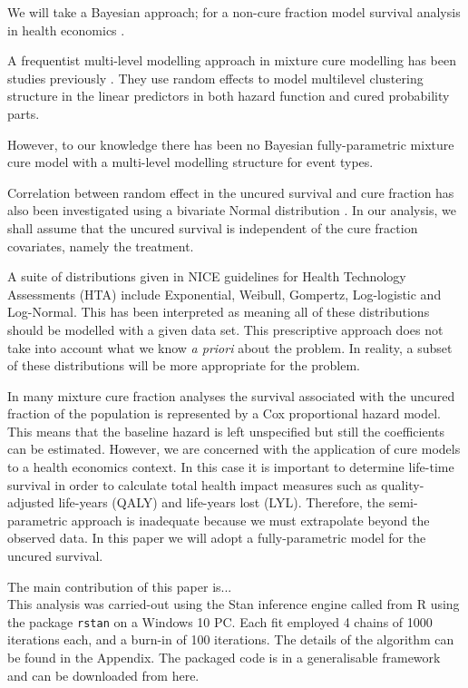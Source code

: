 \documentclass[AMA,STIX1COL]{WileyNJD-v2}
\begin{document}
We will take a Bayesian approach; for a non-cure fraction model survival analysis in health economics \cite{Demiris2006,Jackson2010}.

A frequentist multi-level modelling approach in mixture cure modelling has been studies previously \cite{Lai2009}.
They use random effects to model multilevel clustering structure in the linear predictors in both hazard function and cured probability parts.

However, to our knowledge there has been no Bayesian fully-parametric mixture cure model with a multi-level modelling structure for event types.

Correlation between random effect in the uncured survival and cure fraction has also been investigated using a bivariate Normal distribution \cite{Lai2008}.
In our analysis, we shall assume that the uncured survival is independent of the cure fraction covariates, namely the treatment.

A suite of distributions given in NICE guidelines for Health Technology Assessments (HTA) \cite{Latimer2011} include
Exponential, Weibull, Gompertz, Log-logistic and Log-Normal.
This has been interpreted as meaning all of these distributions should be modelled with a given data set.
This prescriptive approach does not take into account what we know {\it a priori} about the problem.
In reality, a subset of these distributions will be more appropriate for the problem.

In many mixture cure fraction analyses the survival associated with the uncured fraction of the population is represented by a Cox proportional hazard model.
This means that the baseline hazard is left unspecified but still the coefficients can be estimated.
However, we are concerned with the application of cure models to a health economics context.
In this case it is important to determine life-time survival in order to calculate total health impact measures such as quality-adjusted life-years (QALY) and life-years lost (LYL).
Therefore, the semi-parametric approach is inadequate because we must extrapolate beyond the observed data.
In this paper we will adopt a fully-parametric model for the uncured survival.

The main contribution of this paper is...\\
This analysis was carried-out using the Stan inference engine
\cite{carpenter2017stan} called from R \cite{Rcoreteam} using the package \texttt{rstan} on a Windows 10 PC.
Each fit employed 4 chains of 1000 iterations each, and a burn-in of 100 iterations.
The details of the algorithm can be found in the Appendix.
The packaged code is in a generalisable framework and can be downloaded from here.
\end{document}
